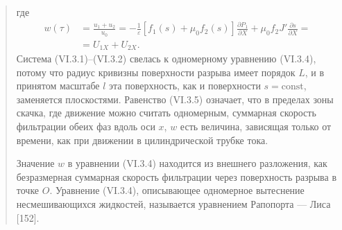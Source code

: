\documentclass[12pt,a4paper]{article}
\begin{document}
\begin{quote}
где
\begin{equation}\begin{aligned}
w(\tau)&=\frac{u_1+u_2}{u_0}=-\frac1\varepsilon[f_1(s)+\mu_0f_2(s)]\frac{\partial P_1}{\partial X}+\mu_0f_2J'\frac{\partial s}{\partial X}=\\
&=U_{1X}+U_{2X}.
\end{aligned}\tag{VI.3.5}\label{q12:eq-VI-3-5}\end{equation}
Система (VI.3.1)--(VI.3.2) свелась к одномерному уравнению (VI.3.4), потому что радиус кривизны поверхности разрыва имеет порядок $L$, и в принятом масштабе $l$ эта поверхность, как и поверхности $s=\mathrm{const}$, заменяется плоскостями. Равенство (VI.3.5) означает, что в пределах зоны скачка, где движение можно считать одномерным, суммарная скорость фильтрации обеих фаз вдоль оси $x$, $w$ есть величина, зависящая только от времени, как при движении в цилиндрической трубке тока.

Значение $w$ в уравнении (VI.3.4) находится из внешнего разложения, как безразмерная суммарная скорость фильтрации через поверхность разрыва в точке $O$. Уравнение (VI.3.4), описывающее одномерное вытеснение несмешивающихся жидкостей, называется уравнением Рапопорта --- Лиса [152].
\par\nobreak{}\par
\end{quote}
\end{document}
